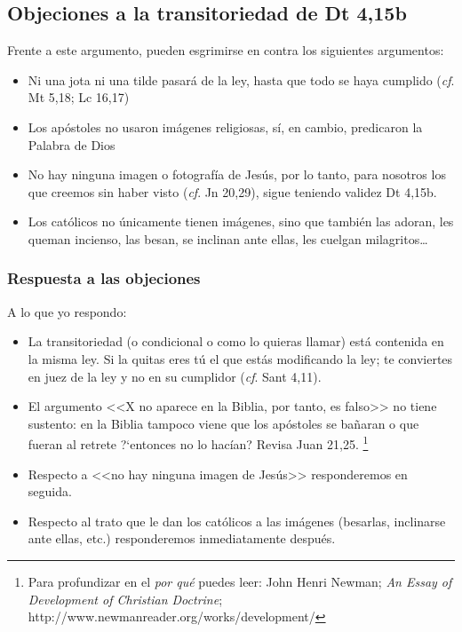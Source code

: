 \documentclass{article}
\begin{document}
\subsection{Objeciones a la transitoriedad de Dt 4,15b}

Frente a este argumento, pueden esgrimirse en contra los siguientes argumentos:

\begin{itemize}
\item Ni una jota ni una tilde pasará de la ley, hasta que todo se haya cumplido (\emph{cf}. Mt 5,18; Lc 16,17)
\item Los ap\'ostoles no usaron im\'agenes religiosas, s\'{i}, en cambio, predicaron la Palabra de Dios
\item No hay ninguna imagen o fotograf\'{i}a de Jes\'us, por lo tanto, para nosotros los que creemos sin haber visto (\emph{cf}. Jn 20,29), sigue teniendo validez Dt 4,15b.
\item Los cat\'olicos no \'unicamente tienen im\'agenes, sino que tambi\'en las adoran, les queman incienso, las besan, se inclinan ante ellas, les cuelgan milagritos\ldots
\end{itemize}

\subsubsection{Respuesta a las objeciones}

A lo que yo respondo:

\begin{itemize}
\item La transitoriedad (o condicional o como lo quieras llamar) est\'a contenida en la misma ley. Si la quitas eres t\'u el que est\'as modificando la ley; te conviertes en juez de la ley y no en su cumplidor (\emph{cf}. Sant 4,11).
\item El argumento <<X no aparece en la Biblia, por tanto, es falso>> no tiene sustento: en la Biblia tampoco viene que los ap\'ostoles se ba\~naran o que fueran al retrete ?`entonces no lo hac\'{i}an? Revisa Juan 21,25.%
    \footnote{Para profundizar en el \emph{por qu\'e} puedes leer: John Henri Newman; \emph{An Essay of Development of Christian Doctrine}; http://www.newmanreader.org/works/development/}
\item Respecto a <<no hay ninguna imagen de Jes\'us>> responderemos en seguida.
\item Respecto al trato que le dan los cat\'olicos a las im\'agenes (besarlas, inclinarse ante ellas, etc.) responderemos inmediatamente despu\'es.
\end{itemize}
\end{document}
